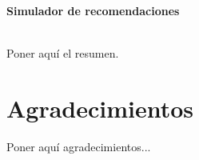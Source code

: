 \chapter*{}

\cleardoublepage
\thispagestyle{empty}

\begin{center}
{\large\bfseries Simulador de recomendaciones}\\
\end{center}


\vspace{0.7cm}
\\

Poner aquí el resumen.
\cleardoublepage


\thispagestyle{empty}


\chapter*{Agradecimientos}
\thispagestyle{empty}

       \vspace{1cm}


Poner aquí agradecimientos...

\cleardoublepage

\tableofcontents %

\cleardoublepage
{} %
\listoffigures %

\cleardoublepage
{} %
\listoftables %
